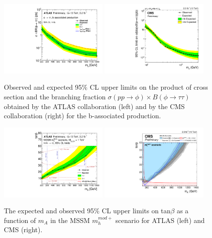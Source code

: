 \begin{figure}
\centering
\includegraphics[width=0.48\textwidth, angle=0] {figures/fig_2Htautau_b.pdf}
\includegraphics[width=0.48\textwidth, angle=0] {figures/fig_2Htautau_d.pdf}
\caption{ Observed and expected 95\% CL upper limits on the product of cross section and the branching fraction $\sigma(pp\rightarrow \phi) \times B(\phi\rightarrow \tau\tau)$ obtained by the ATLAS collaboration (left) and by the CMS collaboration (right) for the b-associated production.}
\label{fig_2bHtautau}   
\end{figure}

\begin{figure}[tbh!]
\centering
\includegraphics[width=0.48\textwidth, angle=0] {figures/fig_3Htautau_a.pdf}
\includegraphics[width=0.48\textwidth, angle=0] {figures/fig_3Htautau_b.pdf}
\caption{ The expected and observed 95\% CL upper limits on tan$\beta$ as a function of $m_{A}$ in the MSSM $m_{h}^{mod+}$ scenario for ATLAS (left) and CMS (right).}
\label{fig_3Htautau}   
\end{figure}

